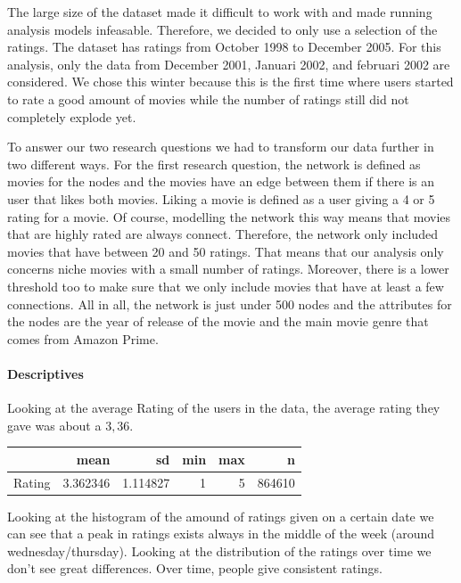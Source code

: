 \documentclass[
  man]{apa6}
\begin{document}
The large size of the dataset made it difficult to work with and made
running analysis models infeasable. Therefore, we decided to only use a
selection of the ratings. The dataset has ratings from October 1998 to
December 2005. For this analysis, only the data from December 2001,
Januari 2002, and februari 2002 are considered. We chose this winter
because this is the first time where users started to rate a good amount
of movies while the number of ratings still did not completely explode
yet.

To answer our two research questions we had to transform our data
further in two different ways. For the first research question, the
network is defined as movies for the nodes and the movies have an edge
between them if there is an user that likes both movies. Liking a movie
is defined as a user giving a 4 or 5 rating for a movie. Of course,
modelling the network this way means that movies that are highly rated
are always connect. Therefore, the network only included movies that
have between 20 and 50 ratings. That means that our analysis only
concerns niche movies with a small number of ratings. Moreover, there is
a lower threshold too to make sure that we only include movies that have
at least a few connections. All in all, the network is just under 500
nodes and the attributes for the nodes are the year of release of the
movie and the main movie genre that comes from Amazon Prime.

\hypertarget{descriptives}{%
\paragraph{Descriptives}\label{descriptives}}

Looking at the average Rating of the users in the data, the average
rating they gave was about a \(3,36\).

\begin{table}
\centering
\begin{tabular}{l|r|r|r|r|r}
\hline
  & mean & sd & min & max & n\\
\hline
Rating & 3.362346 & 1.114827 & 1 & 5 & 864610\\
\hline
\end{tabular}
\end{table}

Looking at the histogram of the amound of ratings given on a certain
date we can see that a peak in ratings exists always in the middle of
the week (around wednesday/thursday). Looking at the distribution of the
ratings over time we don't see great differences. Over time, people give
consistent ratings.
\end{document}
